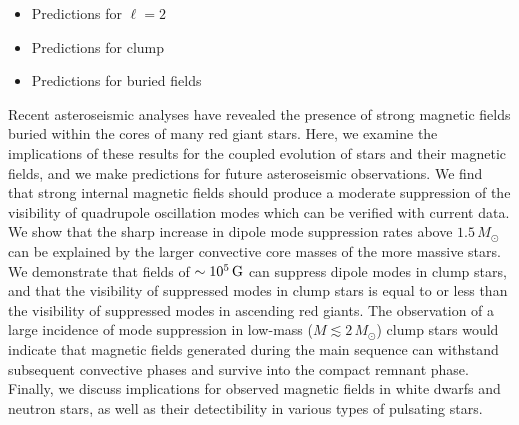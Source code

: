 \begin{itemize}
\item Predictions for $\ell = 2$
\item Predictions for clump 
\item Predictions for buried fields
\end{itemize}



Recent asteroseismic analyses have revealed the presence of strong magnetic fields buried within the cores of many red giant stars. Here, we examine the implications of these results for the coupled evolution of stars and their magnetic fields, and we make predictions for future asteroseismic observations. We find that strong internal magnetic fields should produce a moderate suppression of the visibility of quadrupole oscillation modes which can be verified with current data. We show that the sharp increase in dipole mode suppression rates above $1.5 \, M_\odot$ can be explained by the larger convective core masses of the more massive stars. 
We demonstrate that fields of $\sim 10^5 \, {\rm G}$ can suppress dipole modes in clump stars, and that the visibility of suppressed modes in clump stars is equal to or less than the visibility of suppressed modes in ascending red giants. The observation of a large incidence of mode suppression in low-mass ($M \lesssim 2 \, M_\odot$) clump stars would indicate that magnetic fields generated during the main sequence can withstand subsequent convective phases and survive into the compact remnant phase. Finally, we discuss implications for observed magnetic fields in white dwarfs and neutron stars, as well as their detectibility in various types of pulsating stars.